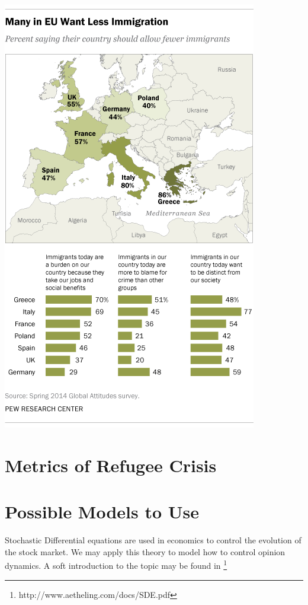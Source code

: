 \documentclass{article}
\begin{document}
\begin{center}
\includegraphics[scale=0.5]{ImmigrationPoll}
\end{center}

\section{Metrics of Refugee Crisis}

\section{Possible Models to Use}

Stochastic Differential equations are used in economics to control the evolution of the stock market. We may apply this theory to model how to control opinion dynamics. A soft introduction to the topic may be found in \footnote{http://www.aetheling.com/docs/SDE.pdf}
\end{document}
